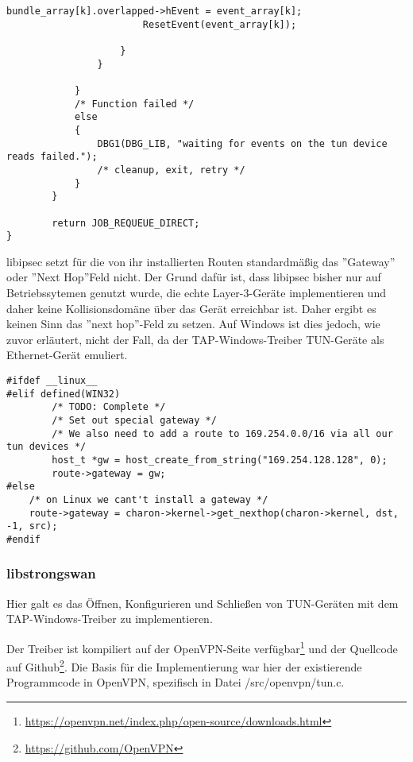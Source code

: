\begin{lstlisting}[caption=Code für handle\_plain auf Windows]
                        bundle_array[k].overlapped->hEvent = event_array[k];
                        ResetEvent(event_array[k]);

                    }
                }

            }
            /* Function failed */
            else
            {
                DBG1(DBG_LIB, "waiting for events on the tun device reads failed.");
                /* cleanup, exit, retry */
            }
        }

        return JOB_REQUEUE_DIRECT;
}
\end{lstlisting}

libipsec setzt für die von ihr installierten Routen standardmäßig das ''Gateway''
oder ''Next Hop''Feld nicht. Der Grund dafür ist, dass libipsec bisher nur auf
Betriebssytemen genutzt wurde, die echte Layer-3-Geräte implementieren und
daher keine Kollisionsdomäne über das Gerät erreichbar ist. Daher ergibt es keinen
Sinn das ''next hop''-Feld zu setzen.
Auf Windows ist dies jedoch, wie zuvor erläutert, nicht der Fall, da der TAP-Windows-Treiber
TUN-Geräte als Ethernet-Gerät emuliert.
\begin{lstlisting}[caption=Patch für die Routen-Installation von libipsec]
#ifdef __linux__
#elif defined(WIN32)
        /* TODO: Complete */
        /* Set out special gateway */
        /* We also need to add a route to 169.254.0.0/16 via all our tun devices */
        host_t *gw = host_create_from_string("169.254.128.128", 0);
        route->gateway = gw;
#else
	/* on Linux we cant't install a gateway */
	route->gateway = charon->kernel->get_nexthop(charon->kernel, dst, -1, src);
#endif
\end{lstlisting}
\subsubsection{libstrongswan}
Hier galt es das Öffnen, Konfigurieren und Schließen von TUN-Geräten
mit dem TAP-Windows-Treiber zu implementieren.

Der Treiber ist kompiliert auf der OpenVPN-Seite
verfügbar\footnote{\url{https://openvpn.net/index.php/open-source/downloads.html}}
und der Quellcode auf Github\footnote{\url{https://github.com/OpenVPN}}.
Die Basis für die Implementierung war hier der existierende Programmcode in
OpenVPN, spezifisch in Datei /src/openvpn/tun.c.

